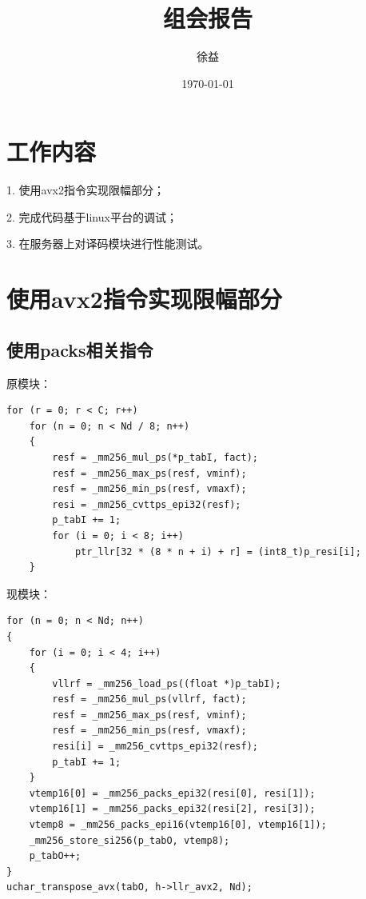 \documentclass{article}
\title{组会报告}
\author{徐益}
\date{\today}
\begin{document}
\maketitle


\section{工作内容}
1. 使用avx2指令实现限幅部分；

2. 完成代码基于linux平台的调试；

3. 在服务器上对译码模块进行性能测试。

\section{使用avx2指令实现限幅部分}
\subsection{使用packs相关指令}
原模块：
\lstset{language=C++}
\begin{lstlisting}
for (r = 0; r < C; r++)
	for (n = 0; n < Nd / 8; n++)
	{
		resf = _mm256_mul_ps(*p_tabI, fact);
		resf = _mm256_max_ps(resf, vminf);
		resf = _mm256_min_ps(resf, vmaxf);
		resi = _mm256_cvttps_epi32(resf);
		p_tabI += 1;
		for (i = 0; i < 8; i++)
			ptr_llr[32 * (8 * n + i) + r] = (int8_t)p_resi[i];
	}
\end{lstlisting}
现模块：
\lstset{language=C++}
\begin{lstlisting}
for (n = 0; n < Nd; n++)
{
	for (i = 0; i < 4; i++)
	{
		vllrf = _mm256_load_ps((float *)p_tabI);
		resf = _mm256_mul_ps(vllrf, fact);
		resf = _mm256_max_ps(resf, vminf);
		resf = _mm256_min_ps(resf, vmaxf);
		resi[i] = _mm256_cvttps_epi32(resf);
		p_tabI += 1;
	}
	vtemp16[0] = _mm256_packs_epi32(resi[0], resi[1]);
	vtemp16[1] = _mm256_packs_epi32(resi[2], resi[3]);
	vtemp8 = _mm256_packs_epi16(vtemp16[0], vtemp16[1]);
	_mm256_store_si256(p_tabO, vtemp8);
	p_tabO++;
}
uchar_transpose_avx(tabO, h->llr_avx2, Nd);
\end{lstlisting}
\end{document}
